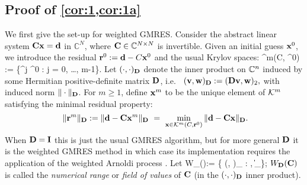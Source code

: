 %

\subsection{Proof of \cref{cor:1,cor:1a}}

We first give the set-up for weighted GMRES.
Consider the abstract  linear system 
$\mathbf{C} \mathbf{x} = \mathbf{d}$
in $\mathbb{C}^N$, where $\mathbf{C} \in \mathbb C^{N\times N}$ is invertible.   
Given an initial guess $\mathbf{x}^0$, we introduce the residual $\mathbf{r}^0 := \mathbf{d}- C \mathbf{x}^0$ and 
the usual Krylov spaces:  
\beqs  
\cK^m(C, \br^0) := \big\{\matrixC^j \br^0 : j = 0, \ldots, m-1\big\}.
\eeqs
Let $(\cdot , \cdot )_{\mathbf{D}}$ denote the inner product on $\mathbb C^n$ 
induced by some Hermitian positive-definite matrix $\mathbf{D}$, i.e.~
$(\mathbf{v},\mathbf{w})_{\mathbf{D}} := (\mathbf{D} \mathbf{v}, \mathbf{w})_2,$
with induced norm $\Vert \cdot \Vert_{\mathbf{D}}$. For $m \geq 1$, define   $\mathbf{x}^m$  to be  the unique element of $\mathcal K^m$ satisfying  the  
 minimal residual  property: 
$$ \ \Vert \mathbf{r}^m \Vert_{\mathbf{D}} := \Vert \mathbf{d} - \mathbf{C} \mathbf{x}^m \Vert_{\mathbf{D}} \ = \ \min_{\mathbf{x} \in \mathcal K^m(C, \mathbf{r}^0)} \Vert {\mathbf{d}} - {\mathbf{C}} {\mathbf{x}} \Vert_{\mathbf{D}}. $$
When $\mathbf{D} = \mathbf{I}$ this is just the usual GMRES algorithm, but for  more general  $\mathbf{D}$ it 
is the weighted GMRES method \cite{Es:98} in which case  
its implementation requires the application of the weighted Arnoldi process \cite{GuPe:14}.
Let 
\beq\label{eq:fov}
W_\Dmat(\matrixC):= \Big\{ (\matrixC \bx, \bx)_{\Dmat} : \bx \in \CCN, \|\bx\|_\Big\};
\eeq
$W_{\mathbf{D}}(\mathbf{C})$ is called the \emph{numerical range} or \emph{field of values} of $\mathbf{C}$ (in the $(\cdot,\cdot)_{\mathbf{D}}$ inner product).

